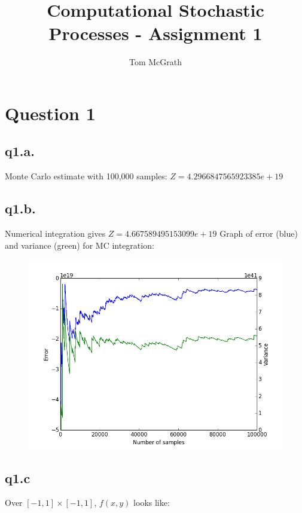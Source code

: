\documentclass[11pt]{article} %
\title{Computational Stochastic Processes - Assignment 1}
\author{Tom McGrath}
\begin{document}
\maketitle

\section{Question 1}

\subsection{q1.a.}

Monte Carlo estimate with 100,000 samples: $Z = 4.2966847565923385e+19$

\subsection{q1.b.}
Numerical integration gives $Z = 4.667589495153099e+19$
Graph of error (blue) and variance (green) for MC integration:

\begin{figure}[h!]
	\centering
		\includegraphics[scale = 0.5]{MC_err_var.png}
\end{figure}

\newpage

\subsection{q1.c}
Over $[-1,1] \times [-1,1]$, $f(x,y)$ looks like:
\end{document}
